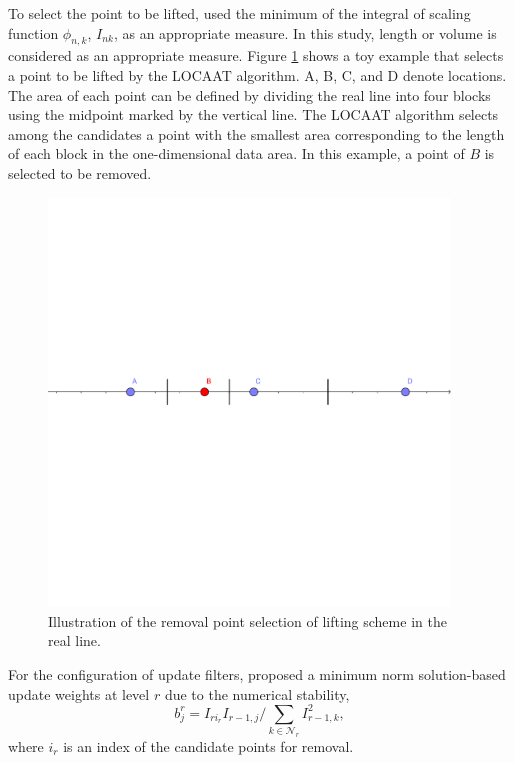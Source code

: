 \documentclass[11pt,titlepage]{article}
\begin{document}
To select the point to be lifted, \cite{Jansen2009} used the minimum of the integral of scaling function $\phi_{n,k}$, $I_{nk}$, as an appropriate measure. In this study, length or volume is considered as an appropriate measure. Figure \ref{fig:removeI} shows a toy example that selects a point to be lifted by the LOCAAT algorithm. A, B, C, and D denote locations. The area of each point can be defined by dividing the real line into four blocks using the midpoint marked by the vertical line. The LOCAAT algorithm selects among the candidates a point with the smallest area corresponding to the length of each block in the one-dimensional data area. In this example, a point of $B$ is selected to be removed. 
\begin{figure}
	\vspace{-5mm}
	\includegraphics[width=0.95\textwidth]{Stream_result/horzline.pdf}
	\caption{Illustration of the removal point selection of lifting scheme in the real line.}
	\vspace{-3mm}
	\label{fig:removeI}
\end{figure}
For the configuration of update filters, \citet{Jansen2009} proposed a minimum norm solution-based update weights at level $r$ due to the numerical stability, 
\begin{equation}
\label{eqn:updatefilter}
b_{j}^r = I_{r i_r}I_{r-1,j}/ \sum_{k\in \mathcal{N}_r} I_{r-1,k}^2,
\end{equation}
where $i_r$ is an index of the candidate points for removal. 
\end{document}

